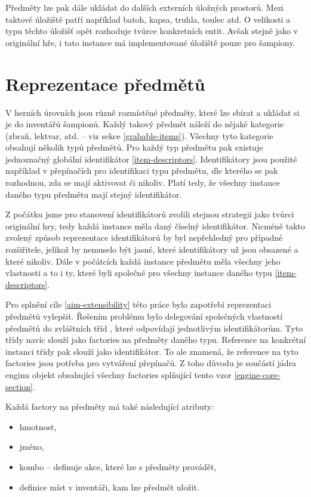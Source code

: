 Předměty lze pak dále ukládat do dalších externích úložných prostorů. 
Mezi taktové úložiště patří například batoh, kapsa, truhla, toulec atd.
O velikosti a typu těchto úložišť opět rozhoduje tvůrce konkretních 
entit. Avšak stejně jako v originální hře, i tato instance má implementované 
úložiště pouze pro šampiony.

\section{Reprezentace předmětů}\label{item-factories}

V herních úrovních jsou různě rozmístěné předměty, které lze sbírat a ukládat si je do inventářů šampionů.
Každý takový předmět náleží do nějaké kategorie (zbraň, lektvar, atd. -- viz sekce \ref{grabable-items}). Všechny 
tyto kategorie obsahují několik typů předmětů. Pro každý typ předmětu pak existuje jednoznačný globální identifikátor \vref{item-descriptors}.
Identifikátory jsou použité například v přepínačích pro identifikaci typu předmětu, dle kterého se pak rozhodnou, 
zda se mají aktivovat či nikoliv. Platí tedy, že všechny instance daného typu předmětu mají stejný identifikátor.

Z počátku jsme pro stanovení identifikátorů zvolili stejnou strategii jako tvůrci originální hry, tedy každá
instance měla daný číselný identifikátor.
Nicméně takto zvolený způsob reprezentace identifikátorů by byl nepřehledný pro případné rozšiřitele, jelikož
by nemuselo být jasné, které identifikátory už jsou obsazené a které nikoliv. Dále v počátcích každá instance
předmětu měla všechny jeho vlastnosti a to i ty, které byli společné pro všechny instance daného typu \vref{item-descriptors}.

Pro splnění cíle \ref{aim-extensibility} této práce bylo zapotřebí reprezentaci předmětů vylepšit.
Řešením problému bylo delegování společných vlastností předmětů do zvláštních tříd , které odpovídají jednotlivým identifikátorům.
Tyto třídy navíc slouží jako factories na předměty daného typu. Reference na konkrétní instanci třídy pak slouží jako identifikátor.
To ale znamená, že reference na tyto factories jsou potřeba pro vytváření přepínačů. Z toho důvodu je součástí jádra enginu
objekt obsahující všechny factories splňující tento vzor \vref{engine-core-section}.


Každá factory na předměty má také následující atributy:
\begin{itemize}
\item hmotnost, 
\item jméno, 
\item kombo -- definuje akce, které lze s předměty provádět,  
\item definice míst v inventáři, kam lze předmět uložit. 
\end{itemize}

